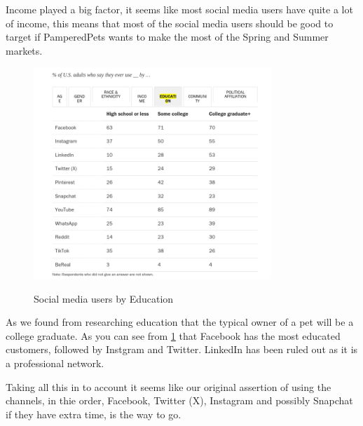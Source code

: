 \documentclass{article}
\begin{document}
Income played a big factor, it seems like most social media users have quite a lot of income, this means that most of the social media users should be good to target if PamperedPets wants to make the most of the Spring and Summer markets.

\FloatBarrier
\begin{figure}[ht]
    \caption{Social media users by Education}
    \centering
    \includegraphics[width=0.8\textwidth]{Education}
    \label{fig:edu}
    \end{figure}
    \FloatBarrier


    As we found from researching education that the typical owner of a pet will be a college graduate. As you can see from \ref{fig:edu} that Facebook has the most educated customers, followed by Instgram and Twitter. LinkedIn has been ruled out as it is a professional network.

    Taking all this in to account it seems like our original assertion of using the channels, in thie order, Facebook, Twitter (X), Instagram and possibly Snapchat if they have extra time, is the way to go.



\bigskip

\end{document}
